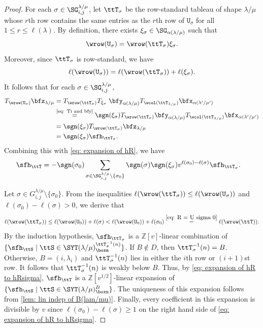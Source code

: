 \documentclass[12pt, reqno]{amsart}
\theoremstyle{plain}
\theoremstyle{definition}
\numberwithin{equation}{section}
\numberwithin{figure}{section}
\numberwithin{table}{section}
\def\Z{\mathbb Z}
\begin{document}
\begin{proof}
For each $\sigma \in \SG^{\lambda/\mu}_{i,j}$, let $\ttT_\sigma$ be the row-standard tableau of shape $\lambda/\mu$ whose $r$th row contains the same entries as the $r$th row of $\mathtt{U}_\sigma$ for all $1 \le r \le \ell(\lambda)$.
By definition, there exists $\xi_\sigma \in \SG_{\alpha(\lambda/\mu)}$ such that
\[
\wrow(\mathtt{U}_\sigma) = \wrow(\ttT_\sigma)\xi_\sigma.
\]
Moreover, since $\ttT_\sigma$ is row-standard, we have 
\[
\ell(\wrow(\mathtt{U}_\sigma)) = \ell(\wrow(\ttT_\sigma)) + \ell(\xi_\sigma).
\]
It follows that for each $\sigma \in \SG^{\lambda/\mu}_{i,j}$,
\begin{align*}
T_{\wrow(\mathtt{U}_\sigma)} \bfz_{\lambda/\mu} 
& = T_{\wrow(\ttT_\sigma)} T_{\xi_\sigma} \; \bfy_{\alpha(\lambda/\mu)} T_{\wcol(\ttT_{\lambda/\mu})} \bfx_{\alpha(\lambda'/\mu')} \\
& \overset{\text{\cref{eq: Ti and bfy}}}{=} \sgn(\xi_\sigma) T_{\wrow(\ttT_\sigma)} \bfy_{\alpha(\lambda/\mu)} T_{\wcol(\ttT_{\lambda/\mu})} \bfx_{\alpha(\lambda'/\mu')} \\
& = \sgn(\xi_\sigma) T_{\wrow(\ttT_\sigma)} \bfz_{\lambda/\mu} \\
& = \sgn(\xi_\sigma) \sfh_{\ttT_\sigma}.
\end{align*}
Combining this with \cref{eq: expansion of hR}, we have 
\begin{align}\label{eq: expansion of hR to hRsigma}
\sfh_{\ttT} 
& =
-\sgn(\sigma_0) \sum_{\sigma \in \SG^{\lambda/\mu}_{i,j} \setminus \{\sigma_0\}} 
\sgn(\sigma)
\sgn(\xi_\sigma)
v^{\ell(\sigma_0) - \ell(\sigma)}  \sfh_{\ttT_\sigma}.
\end{align}

Let $\sigma \in G^{\lambda/\mu}_{i, j} \setminus \{\sigma_0\}$.
From the inequalities $\ell(\wrow(\ttT_\sigma)) \leq  \ell(\wrow(\mathtt{U}_\sigma))$ and  $ \ell(\sigma_0) - \ell(\sigma) > 0$, we derive that 
\begin{equation}\label{eq: lenth cond on row standard}
\ell(\wrow(\ttT_\sigma)) 
\leq 
\ell(\wrow(\mathtt{U}_0)) + \ell(\sigma) 
< \ell(\wrow(\mathtt{U}_0)) + \ell(\sigma_0)
\overset{\cref{eq: R = U sigma 0}}{=} \ell(\wrow(\ttT)).
\end{equation}
By the induction hypothesis, $\sfh_{\ttT_\sigma}$ is a $\Z[v]$-linear combination of $\{\sfh_{\ttS} \mid \ttS \in \SYT(\lambda/\mu)^{\ttT^{-1}_\sigma (n)}_{\boxn}\}$.
If $B \notin D$, then $\ttT_{\sigma}^{-1}(n) = B$. 
Otherwise, $B = (i,\lambda_i)$ and $\ttT_{\sigma}^{-1}(n)$ lies in either the $i$th row or $(i+1)$st row.
It follows that  $\ttT_{\sigma}^{-1}(n)$ is weakly below $B$.
Thus, by \cref{eq: expansion of hR to hRsigma}, $\sfh_{\ttT}$ is a $\Z[v^{1/2}]$-linear expansion of $\{\sfh_{\ttS} \mid \ttS \in \SYT(\lambda/\mu)^B_{\boxn}\}$.
The uniqueness of this expansion follows from \cref{lem: lin indep of B(lam/mu)}.
Finally, every coefficient in this expansion is divisible by $v$ since $\ell(\sigma_0) - \ell(\sigma) \geq 1$ on the right hand side of \cref{eq: expansion of hR to hRsigma}.
\end{proof}
\end{document}
